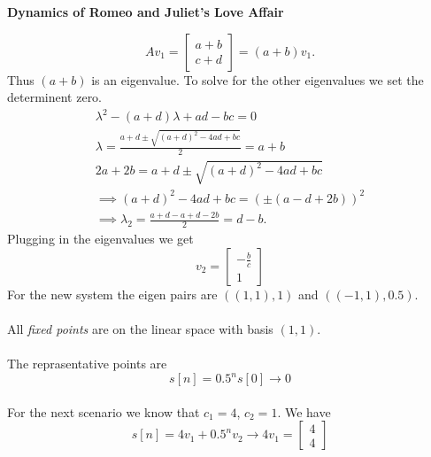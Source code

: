 \documentclass[letter]{article}
\newenvironment{menumerate}{\edef\backupindent{\the\parindent}
  \enumerate\setlength{\parindent}{\backupindent}}
  {\endenumerate}
\begin{document}
\begin{menumerate}
    \newpage
    \item \textbf{Dynamics of Romeo and Juliet's Love Affair}
    \begin{menumerate}
        \item
        \begin{equation*}
            Av_1 = \begin{bmatrix}
                a+b \\
                c+d
            \end{bmatrix} = (a+b)v_1.
        \end{equation*}
        Thus $(a+b)$ is an eigenvalue. To solve for the other eigenvalues we set the determinent zero.
        \begin{equation*}
            \begin{aligned}
                \lambda^2 - (a+d)\lambda +ad  -bc = 0 \\
                \lambda = \frac{a+d \pm \sqrt{(a+d)^2 - 4ad + bc}}{2} = a+b \\
                2a + 2b = a+d \pm    \sqrt{(a+d)^2 - 4ad + bc}   \\
                \implies (a+d)^2 - 4ad + bc = (\pm ( a -d + 2b ))^2 \\
                \implies \lambda_2 = \frac{a+d -a + d - 2b}{2} = d -b.
            \end{aligned}
        \end{equation*}
        Plugging in the eigenvalues we get
        \begin{equation*}
            v_2 = \begin{bmatrix}
                -\frac{b}{c} \\ 1
            \end{bmatrix}
        \end{equation*}
        For the new system the eigen pairs are $((1,1),1)$ and $((-1,1),0.5).$
        \\\\All \emph{fixed points} are on the linear space with basis $(1,1).$
        \\\\The reprasentative points are
        \begin{equation*}
            s[n] = 0.5^n s[0] \to 0
        \end{equation*}
        \\For the next scenario we know that $c_1 = 4$, $c_2 = 1.$ We have
        \begin{equation*}
            s[n] = 4v_1 + 0.5^nv_2 \to 4v_1 =
            \begin{bmatrix}
                4\\ 4
            \end{bmatrix}
        \end{equation*}
        \end{menumerate}


\end{menumerate}
\end{document}
